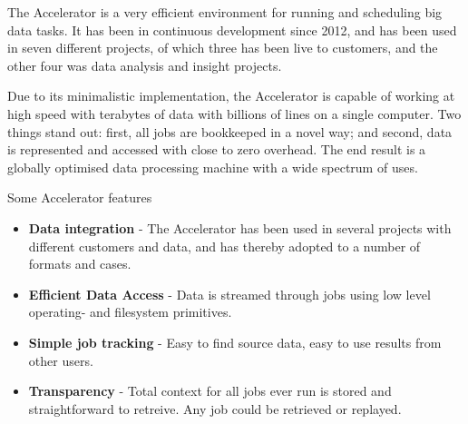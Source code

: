The Accelerator is a very efficient environment for running and
scheduling big data tasks.  It has been in continuous development
since 2012, and has been used in seven different projects, of which
three has been live to customers, and the other four was data analysis
and insight projects.

Due to its minimalistic implementation, the Accelerator is capable of
working at high speed with terabytes of data with billions of lines on
a single computer.  Two things stand out: first, all jobs are
bookkeeped in a novel way; and second, data is represented and
accessed with close to zero overhead.  The end result is a globally
optimised data processing machine with a wide spectrum of uses.

Some Accelerator features
\begin{itemize}
\item \textbf{Data integration} - The Accelerator has been used in
  several projects with different customers and data, and has thereby
  adopted to a number of formats and cases.
\item \textbf{Efficient Data Access} - Data is streamed through jobs
  using low level operating- and filesystem primitives.
\item \textbf{Simple job tracking} - Easy to find source data, easy to
  use results from other users.
\item \textbf{Transparency} - Total context for all jobs ever run is
  stored and straightforward to retreive.  Any job could be retrieved
  or replayed.
\end{itemize}
